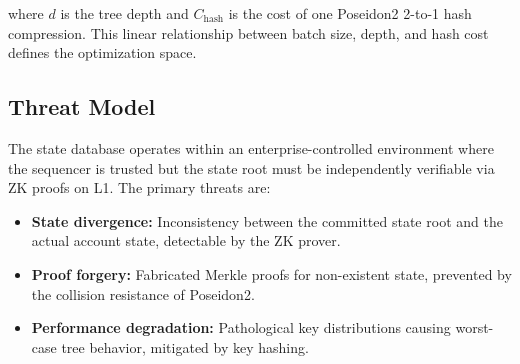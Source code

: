 where $d$ is the tree depth and $C_{\text{hash}}$ is the cost of
one Poseidon2 2-to-1 hash compression. This linear relationship
between batch size, depth, and hash cost defines the optimization
space.

\subsection{Threat Model}

The state database operates within an enterprise-controlled
environment where the sequencer is trusted but the state root
must be independently verifiable via ZK proofs on L1. The primary
threats are:

\begin{itemize}
  \item \textbf{State divergence:} Inconsistency between the
    committed state root and the actual account state, detectable
    by the ZK prover.
  \item \textbf{Proof forgery:} Fabricated Merkle proofs for
    non-existent state, prevented by the collision resistance
    of Poseidon2.
  \item \textbf{Performance degradation:} Pathological key
    distributions causing worst-case tree behavior, mitigated
    by key hashing.
\end{itemize}
